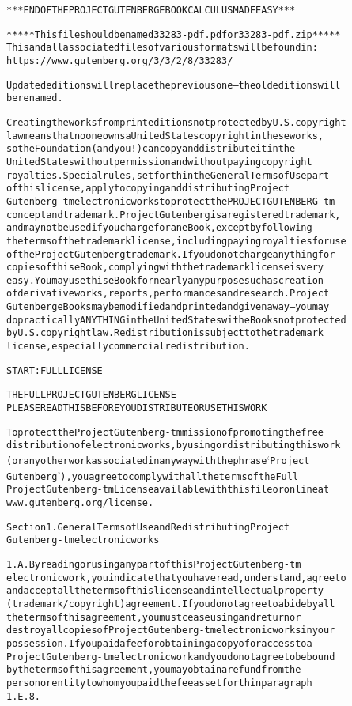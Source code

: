 \documentclass[12pt]{book}[2005/09/16]
\newenvironment{PGtext}{%
\begin{alltt}
\fontsize{9.2}{10.5}\ttfamily\selectfont}%
{\end{alltt}}
\begin{document}
\begin{PGtext}
*** END OF THE PROJECT GUTENBERG EBOOK CALCULUS MADE EASY ***

***** This file should be named 33283-pdf.pdf or 33283-pdf.zip *****
This and all associated files of various formats will be found in:
    https://www.gutenberg.org/3/3/2/8/33283/

Updated editions will replace the previous one--the old editions will
be renamed.

Creating the works from print editions not protected by U.S. copyright
law means that no one owns a United States copyright in these works,
so the Foundation (and you!) can copy and distribute it in the
United States without permission and without paying copyright
royalties. Special rules, set forth in the General Terms of Use part
of this license, apply to copying and distributing Project
Gutenberg-tm electronic works to protect the PROJECT GUTENBERG-tm
concept and trademark. Project Gutenberg is a registered trademark,
and may not be used if you charge for an eBook, except by following
the terms of the trademark license, including paying royalties for use
of the Project Gutenberg trademark. If you do not charge anything for
copies of this eBook, complying with the trademark license is very
easy. You may use this eBook for nearly any purpose such as creation
of derivative works, reports, performances and research. Project
Gutenberg eBooks may be modified and printed and given away--you may
do practically ANYTHING in the United States with eBooks not protected
by U.S. copyright law. Redistribution is subject to the trademark
license, especially commercial redistribution.

START: FULL LICENSE

THE FULL PROJECT GUTENBERG LICENSE
PLEASE READ THIS BEFORE YOU DISTRIBUTE OR USE THIS WORK

To protect the Project Gutenberg-tm mission of promoting the free
distribution of electronic works, by using or distributing this work
(or any other work associated in any way with the phrase `Project
Gutenberg'), you agree to comply with all the terms of the Full
Project Gutenberg-tm License available with this file or online at
www.gutenberg.org/license.

Section 1. General Terms of Use and Redistributing Project
Gutenberg-tm electronic works

1.A. By reading or using any part of this Project Gutenberg-tm
electronic work, you indicate that you have read, understand, agree to
and accept all the terms of this license and intellectual property
(trademark/copyright) agreement. If you do not agree to abide by all
the terms of this agreement, you must cease using and return or
destroy all copies of Project Gutenberg-tm electronic works in your
possession. If you paid a fee for obtaining a copy of or access to a
Project Gutenberg-tm electronic work and you do not agree to be bound
by the terms of this agreement, you may obtain a refund from the
person or entity to whom you paid the fee as set forth in paragraph
1.E.8.


\end{PGtext}
\end{document}
